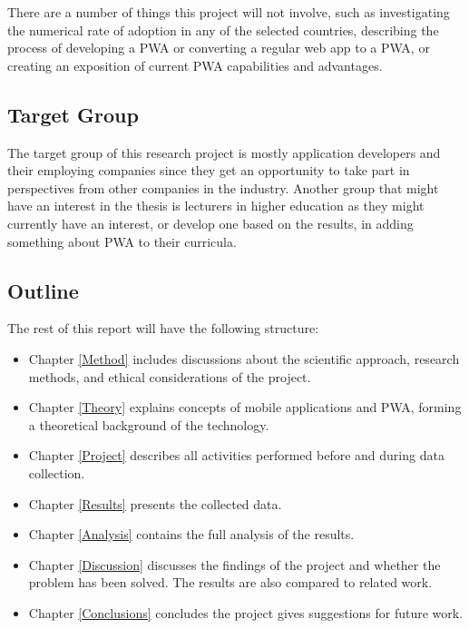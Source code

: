 \documentclass[a4paper,12pt]{article}
\begin{document}
There are a number of things this project will not involve, such as investigating the numerical rate of adoption in any of the selected countries, describing the process of developing a PWA or converting a regular web app to a PWA, or creating an exposition of current PWA capabilities and advantages.


\subsection{Target Group}
\label{Intro_targetGroup}
The target group of this research project is mostly application developers and their employing companies since they get an opportunity to take part in perspectives from other companies in the industry. Another group that might have an interest in the thesis is lecturers in higher education as they might currently have an interest, or develop one based on the results, in adding something about PWA to their curricula.

\subsection{Outline}
\label{Intro_outlin}
The rest of this report will have the following structure:
\begin{itemize}
    \item Chapter \ref{Method} includes discussions about the scientific approach, research methods, and ethical considerations of the project.
    \item Chapter \ref{Theory} explains concepts of mobile applications and PWA, forming a theoretical background of the technology.
    \item Chapter \ref{Project} describes all activities performed before and during data collection.
    \item Chapter \ref{Results} presents the collected data.
    \item Chapter \ref{Analysis} contains the full analysis of the results.
    \item Chapter \ref{Discussion} discusses the findings of the project and whether the problem has been solved. The results are also compared to related work.
    \item Chapter \ref{Conclusions} concludes the project gives suggestions for future work.
\end{itemize}

\newpage
\end{document}
